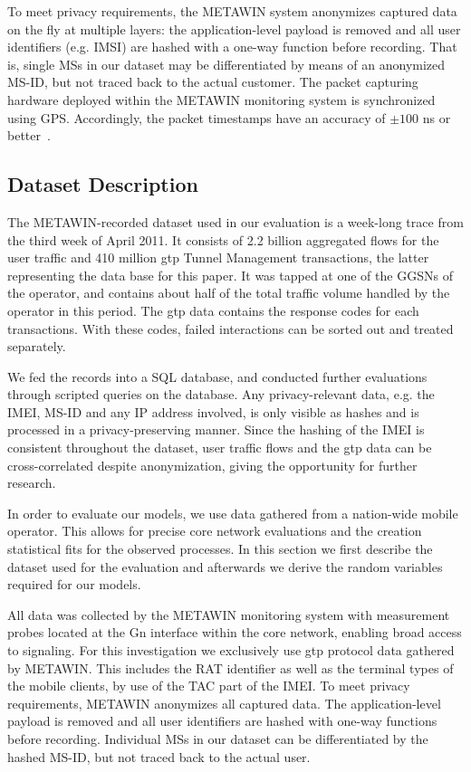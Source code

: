 To meet privacy requirements, the METAWIN system anonymizes captured data on the fly at multiple
layers: the application-level payload is removed and all user identifiers (e.g. \gls{IMSI}) are
hashed with a one-way function before recording. That is, single
\glspl{MS} in our dataset may be differentiated by means of an anonymized \gls{MS-ID}, but not traced back to the actual customer.
The packet capturing hardware deployed within the METAWIN monitoring system is synchronized
using \gls{GPS}. Accordingly, the packet timestamps
have an accuracy of $\pm100$ ns or better~\cite[p.97-98]{donnelly_high_2002}.



\subsection{Dataset Description}


The \gls{METAWIN}-recorded dataset used in our evaluation is a week-long trace from the third week of April 2011. It consists of 2.2 billion aggregated flows for the user traffic and 410 million \gls{gtp} Tunnel Management transactions, the latter representing the data base for this paper. It was tapped at one of the \glspl{GGSN} of the operator, and contains about half of the total traffic volume handled by the operator in this period. The \gls{gtp} data contains the response codes for each transactions. With these codes, failed interactions can be sorted out and treated separately.

We fed the records into a SQL database, and conducted further evaluations through scripted queries on the database. Any privacy-relevant data, e.g. the \gls{IMEI}, \gls{MS-ID} and any IP address involved, is only visible as hashes and is processed in a privacy-preserving manner.  Since the hashing of the \gls{IMEI} is consistent throughout the dataset, user traffic flows and the \gls{gtp} data can be cross-correlated despite anonymization, giving the opportunity for further research.


In order to evaluate our models, we use data gathered from a nation-wide mobile operator. This allows for precise core network evaluations and the creation statistical fits for the observed processes.
In this section we first describe the dataset used for the evaluation and afterwards we derive the random variables required for our models.

All data was collected by the \gls{METAWIN} monitoring system \cite{ricciato_2011} with measurement probes located at the Gn interface within the core network, enabling broad access to signaling. For this investigation we exclusively use \gls{gtp} protocol data gathered by \gls{METAWIN}. This includes the \gls{RAT} identifier as well as the terminal types of the mobile clients, by use of the \gls{TAC} part of the \gls{IMEI}. %
To meet privacy requirements, \gls{METAWIN} anonymizes all captured data. The application-level payload is removed and all user identifiers are hashed with one-way functions before recording. Individual \glspl{MS} in our dataset can be differentiated by the hashed \gls{MS-ID}, but not traced back to the actual user.

